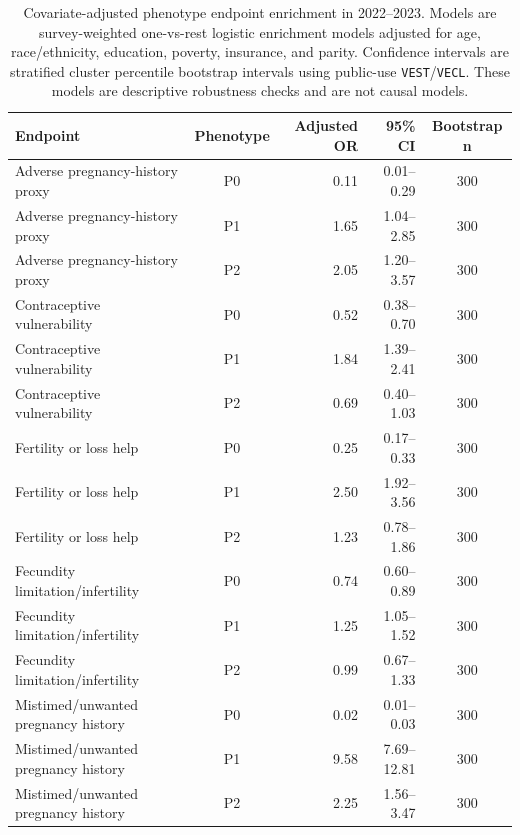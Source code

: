 \begin{table}[H]
\centering
\caption{Covariate-adjusted phenotype endpoint enrichment in 2022--2023. Models are survey-weighted one-vs-rest logistic enrichment models adjusted for age, race/ethnicity, education, poverty, insurance, and parity. Confidence intervals are stratified cluster percentile bootstrap intervals using public-use \texttt{VEST}/\texttt{VECL}. These models are descriptive robustness checks and are not causal models.}
\label{tab:adjusted_enrichment}
\scriptsize
\setlength{\tabcolsep}{3pt}
\begin{tabular*}{\textwidth}{@{\extracolsep{\fill}}>{\raggedright\arraybackslash}p{}crrc@{}}
\toprule
Endpoint & Phenotype & Adjusted OR & 95\% CI & Bootstrap n \\
\midrule
Adverse pregnancy-history proxy & P0 & 0.11 & 0.01--0.29 & 300 \\
Adverse pregnancy-history proxy & P1 & 1.65 & 1.04--2.85 & 300 \\
Adverse pregnancy-history proxy & P2 & 2.05 & 1.20--3.57 & 300 \\
Contraceptive vulnerability & P0 & 0.52 & 0.38--0.70 & 300 \\
Contraceptive vulnerability & P1 & 1.84 & 1.39--2.41 & 300 \\
Contraceptive vulnerability & P2 & 0.69 & 0.40--1.03 & 300 \\
Fertility or loss help & P0 & 0.25 & 0.17--0.33 & 300 \\
Fertility or loss help & P1 & 2.50 & 1.92--3.56 & 300 \\
Fertility or loss help & P2 & 1.23 & 0.78--1.86 & 300 \\
Fecundity limitation/infertility & P0 & 0.74 & 0.60--0.89 & 300 \\
Fecundity limitation/infertility & P1 & 1.25 & 1.05--1.52 & 300 \\
Fecundity limitation/infertility & P2 & 0.99 & 0.67--1.33 & 300 \\
Mistimed/unwanted pregnancy history & P0 & 0.02 & 0.01--0.03 & 300 \\
Mistimed/unwanted pregnancy history & P1 & 9.58 & 7.69--12.81 & 300 \\
Mistimed/unwanted pregnancy history & P2 & 2.25 & 1.56--3.47 & 300 \\
\bottomrule
\end{tabular*}
\end{table}
